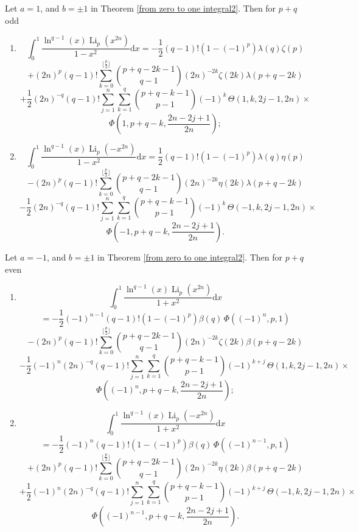 \documentclass[11pt,reqno]{article}
\begin{document}
\begin{corollary}
	Let $a=1$, and $b=\pm1$ in Theorem \ref{from zero to one integral2}. Then for $p+q$ odd
	\begin{enumerate}
		\item[i)]
		\[\int_0^1\frac{\ln^{q-1}(x)\operatorname{Li}_p(x^{2n})}{1-x^2}\mathrm{d} x=-\frac12(q-1)!(1-{(-1)}^{p})\lambda(q)\zeta(p)\]
		\[+{(2n)}^{p}(q-1)!\sum_{k=0}^{\lfloor\frac{p}{2}\rfloor}\binom{p+q-2k-1}{q-1}{(2n)}^{-2k}\zeta(2k)\lambda(p+q-2k)\]
		\[+\frac12{(2n)}^{-q}(q-1)!\sum_{j=1}^{n}\sum_{k=1}^{q}\binom{p+q-k-1}{p-1}{(-1)}^{k}\,\Theta(1,k,2j-1,2n)\times\]
		\[\Phi\left(1,p+q-k,\frac{2n-2j+1}{2n}\right);\]
		\item[ii)]
		\[\int_0^1\frac{\ln^{q-1}(x)\operatorname{Li}_p(-{x}^{2n})}{1-x^2}\mathrm{d} x=\frac12(q-1)!(1-{(-1)}^{p})\lambda(q)\eta(p)\]
		\[-{(2n)}^{p}(q-1)!\sum_{k=0}^{\lfloor\frac{p}{2}\rfloor}\binom{p+q-2k-1}{q-1}{(2n)}^{-2k}\eta(2k)\lambda(p+q-2k)\]
		\[-\frac12 {(2n)}^{-q}(q-1)!\sum_{j=1}^{n}\sum_{k=1}^{q}\binom{p+q-k-1}{p-1}{(-1)}^{k}\,\Theta(-1,k,2j-1,2n)\times\]
		\[\Phi\left(-1,p+q-k,\frac{2n-2j+1}{2n}\right).\]
	\end{enumerate}
\end{corollary}
\begin{corollary}
	Let $a=-1$, and $b=\pm1$ in Theorem \ref{from zero to one integral2}. Then for $p+q$ even
	\begin{enumerate}
		\item[i)]
		\[\int_0^1\frac{\ln^{q-1}(x)\operatorname{Li}_p({x}^{2n})}{1+x^2}\mathrm{d} x\]
		\[=-\frac12{(-1)}^{n-1}(q-1)!(1-{(-1)}^{p})\beta(q)\,\Phi({(-1)}^{n},p,1)\]
		\[-{(2n)}^{p}(q-1)!\sum_{k=0}^{\lfloor\frac{p}{2}\rfloor}\binom{p+q-2k-1}{q-1}{(2n)}^{-2k}\zeta(2k)\beta(p+q-2k)\]
		\[-\frac12{(-1)}^{n}{(2n)}^{-q}(q-1)!\sum_{j=1}^{n}\sum_{k=1}^{q}\binom{p+q-k-1}{p-1}{(-1)}^{k+j}\,\Theta(1,k,2j-1,2n)\times\]
		\[\Phi\left({(-1)}^{n},p+q-k,\frac{2n-2j+1}{2n}\right);\] 
		\item[ii)]
		\[\int_0^1\frac{\ln^{q-1}(x)\operatorname{Li}_p(-{x}^{2n})}{1+x^2}\mathrm{d} x\]
		\[=-\frac12{(-1)}^{n}(q-1)!(1-{(-1)}^{p})\beta(q)\,\Phi({(-1)}^{n-1},p,1)\]
		\[+{(2n)}^{p}(q-1)!\sum_{k=0}^{\lfloor\frac{p}{2}\rfloor}\binom{p+q-2k-1}{q-1}{(2n)}^{-2k}\eta(2k)\beta(p+q-2k)\]
		\[+\frac12{(-1)}^{n}{(2n)}^{-q}(q-1)!\sum_{j=1}^{n}\sum_{k=1}^{q}\binom{p+q-k-1}{p-1}{(-1)}^{k+j}\,\Theta(-1,k,2j-1,2n)\times\]
		\[\Phi\left({(-1)}^{n-1},p+q-k,\frac{2n-2j+1}{2n}\right).\]
	\end{enumerate}
\end{corollary}
\end{document}
